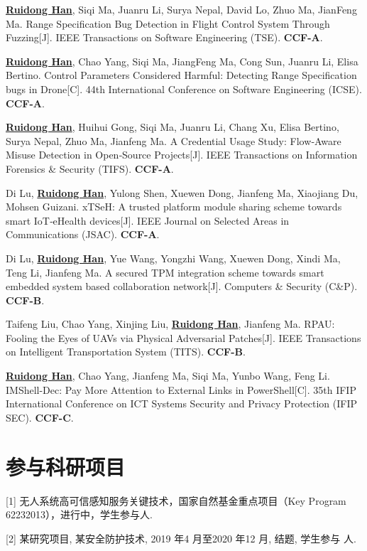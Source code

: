 \begin{enumerate}[label={[}\arabic*{]}]
    \item \underline{\textbf{Ruidong Han}}, Siqi Ma, Juanru Li, Surya Nepal, David Lo, Zhuo Ma, JianFeng Ma. 
    Range Specification Bug Detection in Flight Control System Through Fuzzing[J]. 
    IEEE Transactions on Software Engineering (TSE). 
    \textbf{CCF-A}. 

    \item \underline{\textbf{Ruidong Han}}, Chao Yang, Siqi Ma, JiangFeng Ma, Cong Sun, Juanru Li, Elisa Bertino. 
    Control Parameters Considered Harmful: Detecting Range Specification bugs in Drone[C]. 
    44th International Conference on Software Engineering (ICSE). 
    \textbf{CCF-A}.

    \item \underline{\textbf{Ruidong Han}}, Huihui Gong, Siqi Ma, Juanru Li, Chang Xu, Elisa Bertino, Surya Nepal, Zhuo Ma, Jianfeng Ma.
    A Credential Usage Study: Flow‑Aware Misuse Detection in Open‑Source Projects[J].
    IEEE Transactions on Information Forensics \& Security (TIFS).
    \textbf{CCF-A}.

    \item Di Lu, \underline{\textbf{Ruidong Han}}, Yulong Shen, Xuewen Dong, Jianfeng Ma, Xiaojiang          Du, Mohsen Guizani.
    xTSeH: A trusted platform module sharing scheme towards smart IoT‑eHealth devices[J].
    IEEE Journal on Selected Areas in Communications (JSAC).
    \textbf{CCF-A}.

    \item Di Lu, \underline{\textbf{Ruidong Han}}, Yue Wang, Yongzhi Wang, Xuewen Dong, Xindi Ma, Teng Li, Jianfeng Ma.
    A secured TPM integration scheme towards smart embedded system based collaboration network[J].
    Computers \& Security (C\&P).
    \textbf{CCF-B}.

    \item Taifeng Liu, Chao Yang, Xinjing Liu, \underline{\textbf{Ruidong Han}}, Jianfeng Ma.
    RPAU: Fooling the Eyes of UAVs via Physical Adversarial Patches[J].
    IEEE Transactions on Intelligent Transportation System (TITS).
    \textbf{CCF-B}.

    \item \underline{\textbf{Ruidong Han}}, Chao Yang, Jianfeng Ma, Siqi Ma, Yunbo Wang, Feng Li.
    IMShell-Dec: Pay More Attention to External Links in PowerShell[C].
    35th IFIP International Conference on ICT Systems Security and Privacy Protection (IFIP SEC).
    \textbf{CCF-C}.
    

\end{enumerate}

\section{参与科研项目}

[1] 无人系统高可信感知服务关键技术，国家自然基金重点项目（Key Program 62232013），进行中，学生参与人.

[2] 某研究项目, 某安全防护技术, 2019 年4 月至2020 年12 月, 结题, 学生参与
人.


